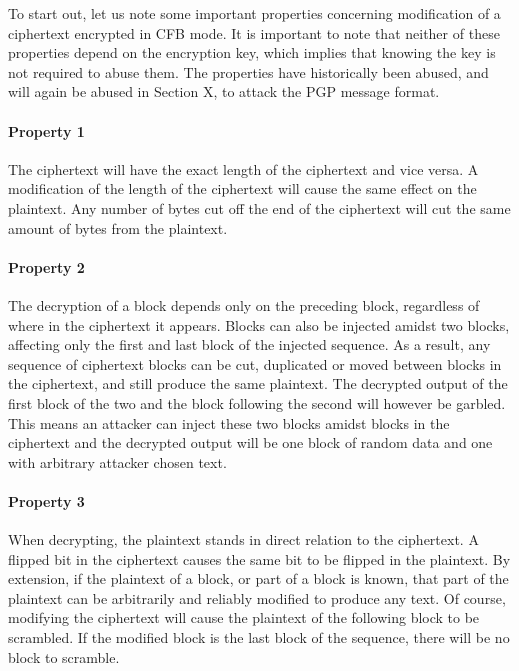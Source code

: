 \documentclass[runningheads,a4paper]{llncs}[2018/03/10]
\begin{document}
To start out, let us note some important properties concerning modification of a 
ciphertext encrypted in CFB mode. It is important to note that neither of these 
properties depend on the encryption key, which implies that knowing the key is 
not required to abuse them. The properties have historically been abused, and 
will again be abused in Section X, to attack the PGP message format.



\paragraph{Property 1} The ciphertext will have the exact length of
the ciphertext and vice versa. A modification of the length of the
ciphertext will cause the same effect on the plaintext. Any number of
bytes cut off the end of the ciphertext will cut the same amount of
bytes from the plaintext.
 
\paragraph{Property 2} The decryption of a block depends only on the
preceding block, regardless of where in the ciphertext it
appears. Blocks can also be injected amidst two blocks, affecting only
the first and last block of the injected sequence. As a result, any
sequence of ciphertext blocks can be cut, duplicated or moved between
blocks in the ciphertext, and still produce the same plaintext. The
decrypted output of the first block of the two and the block following
the second will however be garbled. This means an attacker can inject
these two blocks amidst blocks in the ciphertext and the decrypted
output will be one block of random data and one with arbitrary
attacker chosen text.


\paragraph{Property 3} When decrypting, the plaintext stands in direct
relation to the ciphertext. A flipped bit in the ciphertext causes the
same bit to be flipped in the plaintext. By extension, if the
plaintext of a block, or part of a block is known, that part of the
plaintext can be arbitrarily and reliably modified to produce any
text. Of course, modifying the ciphertext will cause the plaintext of
the following block to be scrambled. If the modified block is the last
block of the sequence, there will be no block to scramble.
\end{document}
